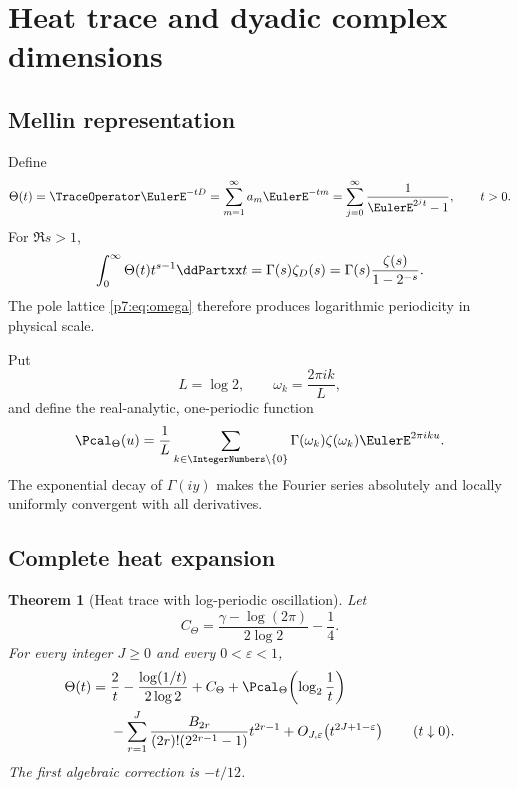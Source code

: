 \documentclass[11pt]{article}
\numberwithin{equation}{section}
\newtheorem{theorem}{Theorem}[section]
\theoremstyle{definition}
\theoremstyle{remark}
\begin{document}
\section{Heat trace and dyadic complex dimensions}

\subsection{Mellin representation}

Define
\begin{equation}\label{p7:eq:Theta}
 \Theta(t)=\TraceOperator\EulerE^{-tD}
 =\sum_{m=1}^{\infty}a_m\EulerE^{-tm}
 =\sum_{j=0}^{\infty}\frac1{\EulerE^{2^jt}-1},
 \qquad t>0.
\end{equation}
For $\Re s>1$,
\begin{equation}\label{p7:eq:Theta-Mellin}
 \int_0^{\infty}\Theta(t)t^{s-1}\ddPartxx t
 =\Gamma(s)\zeta_D(s)
 =\Gamma(s)\frac{\zeta(s)}{1-2^{-s}}.
\end{equation}
The pole lattice \cref{p7:eq:omega} therefore produces logarithmic periodicity in physical scale.

Put
\[
 L=\log2,
 \qquad
 \omega_k=\frac{2\pi i k}{L},
\]
and define the real-analytic, one-periodic function
\begin{equation}\label{p7:eq:Ptheta}
 \Pcal_\Theta(u)=\frac1L\sum_{k\in\IntegerNumbers\setminus\{0\}}
 \Gamma(\omega_k)\zeta(\omega_k)\EulerE^{2\pi iku}.
\end{equation}
The exponential decay of $\Gamma(i y)$ makes the Fourier series absolutely and locally uniformly convergent with all derivatives.

\subsection{Complete heat expansion}

\begin{theorem}[Heat trace with log-periodic oscillation]\label{p7:thm:heat}
Let
\begin{equation}\label{p7:eq:Ctheta}
 C_\Theta=\frac{\gamma-\log(2\pi)}{2\log2}-\frac14.
\end{equation}
For every integer $J\ge0$ and every $0<\varepsilon<1$,
\begin{align}\label{p7:eq:heat-asymp}
 \Theta(t)
 ={}&\frac2t-\frac{\log(1/t)}{2\log2}+C_\Theta
 +\Pcal_\Theta\!\left(\log_2\frac1t\right)\\
 &-\sum_{r=1}^{J}
 \frac{B_{2r}}{(2r)!(2^{2r-1}-1)}t^{2r-1}
 +O_{J,\varepsilon}\!\left(t^{2J+1-\varepsilon}\right)
 \qquad(t\downarrow0).\notag
\end{align}
The first algebraic correction is $-t/12$.
\end{theorem}
\end{document}
